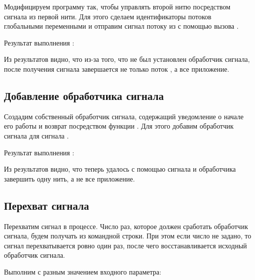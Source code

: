 Модифицируем программу так, чтобы управлять второй нитю посредством сигнала  из первой нити. Для этого сделаем идентификаторы потоков глобальными переменными и отправим сигнал потоку  из  с помощью вызова .



Результат выполнения :



Из результатов видно, что из-за того, что не был установлен обработчик сигнала, после получения сигнала завершается не только поток , а все приложение.

\subsection{Добавление обработчика сигнала}

Создадим собственный обработчик сигнала, содержащий уведомление о начале его работы и возврат посредством функции . Для этого добавим обработчик сигнала  для сигнала .



Результат выполнения :



Из результатов видно, что теперь удалось с помощью сигнала и обработчика завершить одну нить, а не все приложение. 

\subsection{Перехват сигнала }

Перехватим сигнал  в процессе. Число раз, которое должен сработать обработчик сигнала, будем получать из командной строки. При этом если число не задано, то сигнал перехватывается ровно один раз, после чего восстанавливается исходный обработчик сигнала.



Выполним  с разным значением входного параметра:



